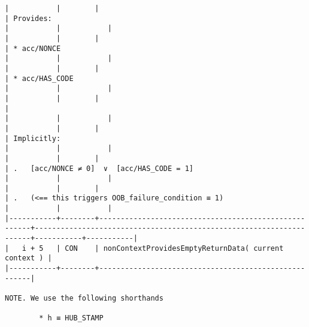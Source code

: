 \documentclass[varwidth=\maxdimen,margin=0.5cm,multi={verbatim}]{standalone}
\begin{document}
\begin{verbatim}
|           |        |                                                      | Provides:                                                           |           |           |
|           |        |                                                      | * acc/NONCE                                                         |           |           |
|           |        |                                                      | * acc/HAS_CODE                                                      |           |           |
|           |        |                                                      |                                                                     |           |           |
|           |        |                                                      | Implicitly:                                                         |           |           |
|           |        |                                                      | .   [acc/NONCE ≠ 0]  ∨  [acc/HAS_CODE = 1]                          |           |           |
|           |        |                                                      | .   (<== this triggers OOB_failure_condition ≡ 1)                   |           |           |
|-----------+--------+------------------------------------------------------+---------------------------------------------------------------------+-----------+-----------|
|   i + 5   | CON    | nonContextProvidesEmptyReturnData( current context ) |
|-----------+--------+------------------------------------------------------|

NOTE. We use the following shorthands

        * h ≡ HUB_STAMP

\end{verbatim}
\end{document}
